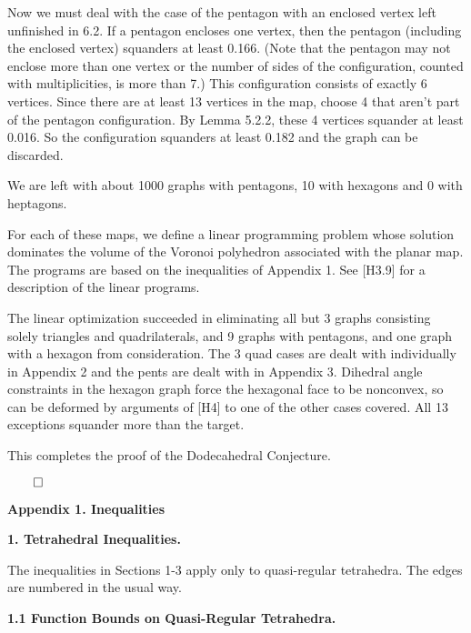 Now we must deal with the case of the pentagon with an enclosed vertex left unfinished in 6.2.  
If a pentagon encloses one vertex, then the pentagon (including the enclosed vertex) squanders at least 0.166.  (Note that the pentagon may not enclose more than one vertex or the number of sides of the configuration, counted with multiplicities, is more than 7.)  This configuration consists of exactly 6 vertices.  Since there are at least 13 vertices in the map, choose 4 that aren't part of the pentagon configuration.  By Lemma 5.2.2, these 4 vertices squander at least 0.016.  So the configuration squanders at least 0.182 and the graph can be discarded.  

We are left with about 1000 graphs with pentagons, 10 with hexagons and 0 with heptagons.


For each of these maps, we define a linear programming problem whose solution dominates the volume of the Voronoi polyhedron associated with the planar map.  
The programs are based on the inequalities of Appendix 1.
See [H3.9] for a description of the linear programs.


The linear optimization succeeded in eliminating all but 3 graphs consisting 
solely triangles and quadrilaterals, and 9 graphs with pentagons, and one graph with a hexagon from consideration.  The  3 quad cases are dealt with individually in Appendix 2 and the pents are dealt with in Appendix 3.  Dihedral angle constraints in the hexagon graph force the hexagonal face to be nonconvex, so can be deformed by arguments of [H4] to one of the other cases covered.  All 13 exceptions squander more than the target.  


\bigskip


This completes the proof of the Dodecahedral Conjecture.

$\qed$

\bigskip




\bigskip

\centerline{\bf Appendix 1. Inequalities}

\bigskip

{\bf 1. Tetrahedral Inequalities.}

\smallskip

The inequalities in Sections 1-3 apply only to quasi-regular tetrahedra.
The edges are numbered in the usual way.

\smallskip

{\bf 1.1 Function Bounds on Quasi-Regular Tetrahedra.}


